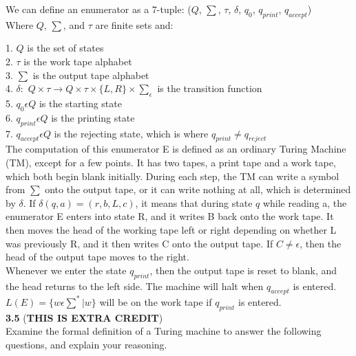 \documentclass[12pt]{article}
\begin{document}
We can define an enumerator as a 7-tuple:
($Q$, $\sum$, $\tau$, $\delta$, $q_0$, $q_{print}$, $q_{accept}$) \\

Where $Q$, $\sum$, and $\tau$ are finite sets and:

1. $Q$ is the set of states \\
2. $\tau$ is the work tape alphabet \\
3. $\sum$ is the output tape alphabet \\
4. $\delta:$ $Q \times \tau \rightarrow Q \times \tau \times \{L, R\} \times \sum_{\epsilon}$
is the transition function \\
5. $q_0 \epsilon Q$ is the starting state \\
6. $q_{print} \epsilon Q$ is the printing state \\
7. $q_{accept} \epsilon Q$ is the rejecting state, which is where $q_{print} \ne q_{reject}$ \\

The computation of this enumerator E is defined as an ordinary Turing Machine (TM),
except for a few points. It has two tapes, a print tape and a work tape, which
both begin blank initially. During each step, the TM can write a symbol from $\sum$
onto the output tape, or it can write nothing at all, which is determined by $\delta$.
If $\delta (q, a) = (r, b, L, c)$, it means that during state $q$ while reading a,
the enumerator E enters into state R, and it writes B back onto the work tape. It
then moves the head of the working tape left or right depending on whether L was
previously R, and it then writes C onto the output tape. If $C \ne \epsilon$, then
the head of the output tape moves to the right. \\

Whenever we enter the state $q_{print}$, then the output tape is reset to blank,
and the head returns to the left side. The machine will halt when $q_{accept}$ is
entered. $L(E) = \{w \epsilon \sum^* | w \}$ will be on the work tape if $q_{print}$
is entered. \\


\pagebreak
\textbf{3.5} (\textbf{THIS IS EXTRA CREDIT}) \\
Examine the formal definition of a Turing machine to answer the following questions,
and explain your reasoning. \\
\end{document}
